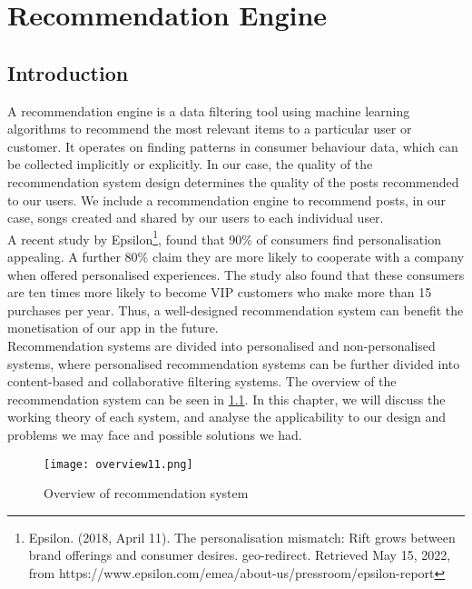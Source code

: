 
\chapter{Recommendation Engine}%
\label{Chapter6} %

\section{Introduction}
A recommendation engine is a data filtering tool using machine learning algorithms to recommend the most relevant items to a particular user or customer. It operates on finding patterns in consumer behaviour data, which can be collected implicitly or explicitly. In our case, the quality of the recommendation system design determines the quality of the posts recommended to our users. We include a recommendation engine to recommend posts, in our case, songs created and shared by our users to each individual user.
\\A recent study by Epsilon\footnote{Epsilon. (2018, April 11). The personalisation mismatch: Rift grows between brand offerings and consumer desires. geo-redirect. Retrieved May 15, 2022, from https://www.epsilon.com/emea/about-us/pressroom/epsilon-report }, found that 90\% of consumers find personalisation appealing. A further 80\% claim they are more likely to cooperate with a company when offered personalised experiences.
The study also found that these consumers are ten times more likely to become VIP customers who make more than 15 purchases per year.
Thus, a well-designed recommendation system can benefit the monetisation of our app in the future.
\\Recommendation systems are divided into personalised and non-personalised systems, where personalised recommendation systems can be further divided into content-based and collaborative filtering systems. 
The overview of the recommendation system can be seen in \cref{fig:overrecomm}. In this chapter, we will discuss the working theory of each system, and analyse the applicability to our design and problems we may face and possible solutions we had.
\begin{figure}[ht]
\centering
\texttt{[image: overview11.png]}
\caption{Overview of recommendation system}
\label{fig:overrecomm}
\end{figure}

